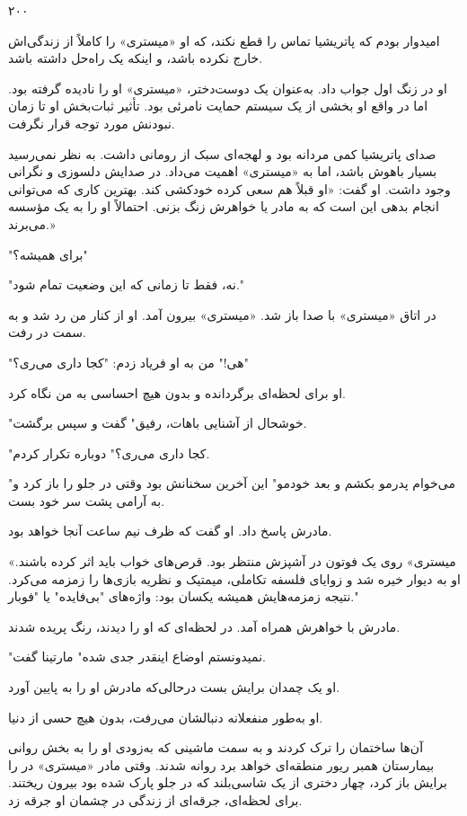 ۲۰۰

امیدوار بودم که پاتریشیا تماس را قطع نکند، که او «میستری» را کاملاً از زندگی‌اش خارج نکرده باشد، و اینکه یک راه‌حل داشته باشد.

او در زنگ اول جواب داد. به‌عنوان یک دوست‌دختر، «میستری» او را نادیده گرفته بود. اما در واقع او بخشی از یک سیستم حمایت نامرئی بود. تأثیر ثبات‌بخش او تا زمان نبودنش مورد توجه قرار نگرفت.

صدای پاتریشیا کمی مردانه بود و لهجه‌ای سبک از رومانی داشت. به نظر نمی‌رسید بسیار باهوش باشد، اما به «میستری» اهمیت می‌داد. در صدایش دلسوزی و نگرانی وجود داشت. او گفت: «او قبلاً هم سعی کرده خودکشی کند. بهترین کاری که می‌توانی انجام بدهی این است که به مادر یا خواهرش زنگ بزنی. احتمالاً او را به یک مؤسسه می‌برند.»

"برای همیشه؟"

"نه، فقط تا زمانی که این وضعیت تمام شود."

در اتاق «میستری» با صدا باز شد. «میستری» بیرون آمد. او از کنار من رد شد و به سمت در رفت.

"هی!" من به او فریاد زدم: "کجا داری می‌ری؟"

او برای لحظه‌ای برگردانده و بدون هیچ احساسی به من نگاه کرد.

"خوشحال از آشنایی باهات، رفیق" گفت و سپس برگشت.

"کجا داری می‌ری؟" دوباره تکرار کردم.

"می‌خوام پدرمو بکشم و بعد خودمو" این آخرین سخنانش بود وقتی در جلو را باز کرد و به آرامی پشت سر خود بست.

مادرش پاسخ داد. او گفت که ظرف نیم ساعت آنجا خواهد بود.

«میستری» روی یک فوتون در آشپزش منتظر بود. قرص‌های خواب باید اثر کرده باشند. او به دیوار خیره شد و زوایای فلسفه تکاملی، میمتیک و نظریه بازی‌ها را زمزمه می‌کرد. نتیجه زمزمه‌هایش همیشه یکسان بود: واژه‌های "بی‌فایده" یا "فوبار."

مادرش با خواهرش همراه آمد. در لحظه‌ای که او را دیدند، رنگ پریده شدند.

"نمیدونستم اوضاع اینقدر جدی شده" مارتینا گفت.

او یک چمدان برایش بست درحالی‌که مادرش او را به پایین آورد.

او به‌طور منفعلانه دنبالشان می‌رفت، بدون هیچ حسی از دنیا.

آن‌ها ساختمان را ترک کردند و به سمت ماشینی که به‌زودی او را به بخش روانی بیمارستان همبر ریور منطقه‌ای خواهد برد روانه شدند. وقتی مادر «میستری» در را برایش باز کرد، چهار دختری از یک شاسی‌بلند که در جلو پارک شده بود بیرون ریختند. برای لحظه‌ای، جرقه‌ای از زندگی در چشمان او جرقه زد.

